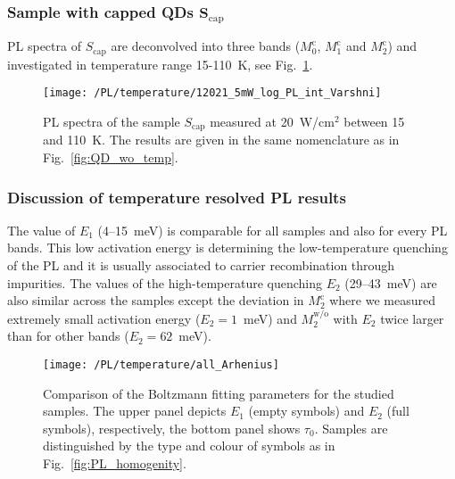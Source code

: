 \newpage
\subsubsection*{Sample with capped QDs $\mathbf{S_\mathrm{cap}}$}
%
PL spectra of ${S_\mathrm{cap}}$ are deconvolved into three bands ($M_0^\mathrm{c}$, $M_1^\mathrm{c}$ and $M_2^\mathrm{c}$) and investigated in temperature range 15-110~K, see Fig.~\ref{fig:QD_c_temp}.
%
\begin{figure}[h]
	\centering
	\texttt{[image: /PL/temperature/12021\_5mW\_log\_PL\_int\_Varshni]}
	\caption{PL spectra of the sample ${S_\mathrm{cap}}$ measured at 20~W/cm$^2$ between 15 and 110~K. The results are given in the same nomenclature as in Fig.~\ref{fig:QD_wo_temp}.}
	\label{fig:QD_c_temp}
\end{figure}

\newpage
\subsubsection*{Discussion of temperature resolved PL results}
The value of $E_1$ (4--15~meV) is comparable for all samples and also for every PL bands. This low activation energy is determining the low-temperature quenching of the PL and it is usually associated to carrier recombination through impurities. The values of the high-temperature quenching $E_2$ (29--43~meV) are also similar across the samples except the deviation in $M_2^\mathrm{c}$ where we measured extremely small activation energy ($E_2=1$~meV) and $M_2^\mathrm{w/o}$ with $E_2$ twice larger than for other bands ($E_2=62$~meV).

\begin{figure}
	\centering
	\texttt{[image: /PL/temperature/all\_Arhenius]}
	\caption{Comparison of the Boltzmann fitting parameters for the studied samples. The upper panel depicts $E_1$ (empty symbols) and $E_2$ (full symbols), respectively, the bottom panel shows $\tau_0$. Samples are distinguished by the type and colour of symbols as in Fig.~\ref{fig:PL_homogenity}.}
	\label{fig:Arrhenius_all}
\end{figure}


